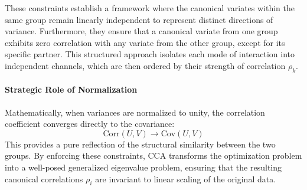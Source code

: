 These constraints establish a framework where the canonical variates within the same group remain linearly independent to represent distinct directions of variance. Furthermore, they ensure that a canonical variate from one group exhibits zero correlation with any variate from the other group, except for its specific partner. This structured approach isolates each mode of interaction into independent channels, which are then ordered by their strength of correlation $\rho_k$.



\paragraph{Strategic Role of Normalization}
Mathematically, when variances are normalized to unity, the correlation coefficient converges directly to the covariance:
\begin{equation}
\text{Corr}(U, V) \rightarrow \text{Cov}(U, V)
\end{equation}
This provides a pure reflection of the structural similarity between the two groups. By enforcing these constraints, CCA transforms the optimization problem into a well-posed generalized eigenvalue problem, ensuring that the resulting canonical correlations $\rho_i$ are invariant to linear scaling of the original data.

